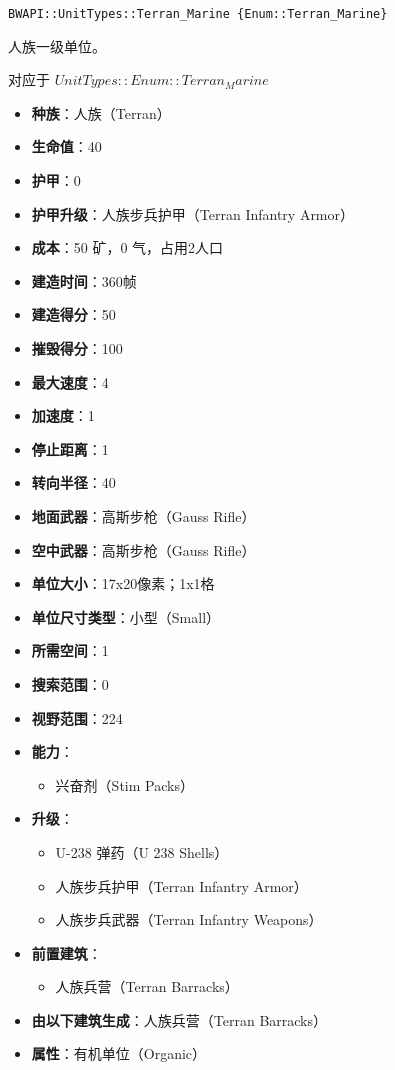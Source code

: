 \begin{tcolorbox}[colback=white, colframe=black!60!white, title=Terran\_Marine(), arc=0mm]
\begin{verbatim}
BWAPI::UnitTypes::Terran_Marine {Enum::Terran_Marine}
\end{verbatim}
人族一级单位。\par
对应于  $UnitTypes::Enum::Terran_Marine$ 
\begin{itemize}
    \item \textbf{种族}：人族（Terran）
    \item \textbf{生命值}：40
    \item \textbf{护甲}：0
    \item \textbf{护甲升级}：人族步兵护甲（Terran Infantry Armor）
    \item \textbf{成本}：50 矿，0 气，占用2人口
    \item \textbf{建造时间}：360帧
    \item \textbf{建造得分}：50
    \item \textbf{摧毁得分}：100
    \item \textbf{最大速度}：4
    \item \textbf{加速度}：1
    \item \textbf{停止距离}：1
    \item \textbf{转向半径}：40
    \item \textbf{地面武器}：高斯步枪（Gauss Rifle）
    \item \textbf{空中武器}：高斯步枪（Gauss Rifle）
    \item \textbf{单位大小}：17x20像素；1x1格
    \item \textbf{单位尺寸类型}：小型（Small）
    \item \textbf{所需空间}：1
    \item \textbf{搜索范围}：0
    \item \textbf{视野范围}：224
    \item \textbf{能力}：
        \begin{itemize}
            \item 兴奋剂（Stim Packs）
        \end{itemize}
    \item \textbf{升级}：
        \begin{itemize}
            \item U-238 弹药（U 238 Shells）
            \item 人族步兵护甲（Terran Infantry Armor）
            \item 人族步兵武器（Terran Infantry Weapons）
        \end{itemize}
    \item \textbf{前置建筑}：
        \begin{itemize}
            \item 人族兵营（Terran Barracks）
        \end{itemize}
    \item \textbf{由以下建筑生成}：人族兵营（Terran Barracks）
    \item \textbf{属性}：有机单位（Organic）
\end{itemize}
\end{tcolorbox}

